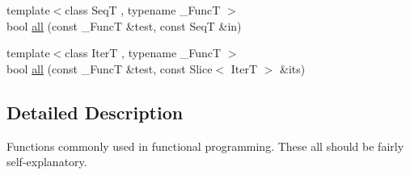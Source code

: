 \begin{DoxyCompactItemize}
\item 
{\footnotesize template$<$class Seq\-T , typename \-\_\-\-Func\-T $>$ }\\bool \hyperlink{namespaceseq_1_1functional_a2ffd96ef955260495f894c6eee90983c}{all} (const \-\_\-\-Func\-T \&test, const Seq\-T \&in)
\item 
{\footnotesize template$<$class Iter\-T , typename \-\_\-\-Func\-T $>$ }\\bool \hyperlink{namespaceseq_1_1functional_a6758cc8e1072ff3e3c0c32f121c879f4}{all} (const \-\_\-\-Func\-T \&test, const Slice$<$ Iter\-T $>$ \&its)
\end{DoxyCompactItemize}


\subsection{Detailed Description}
Functions commonly used in functional programming. These all should be fairly self-\/explanatory. 


